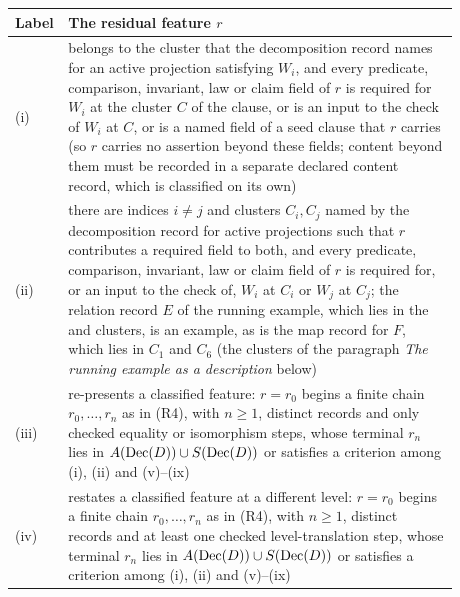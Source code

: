 \begin{longtable}{@{}l>{\raggedright\arraybackslash}p{0.88\linewidth}@{}}
\toprule
Label & The residual feature \(r\) \\
\midrule
\endhead
(i) & belongs to the cluster that the decomposition record names for an active projection satisfying \(W_i\), and every predicate, comparison, invariant, law or claim field of \(r\) is required for \(W_i\) at the cluster \(C\) of the clause, or is an input to the check of \(W_i\) at \(C\), or is a named field of a seed clause that \(r\) carries (so \(r\) carries no assertion beyond these fields; content beyond them must be recorded in a separate declared content record, which is classified on its own) \\
(ii) & there are indices \(i\neq j\) and clusters \(C_i,C_j\) named by the decomposition record for active projections such that \(r\) contributes a required field to both, and every predicate, comparison, invariant, law or claim field of \(r\) is required for, or an input to the check of, \(W_i\) at \(C_i\) or \(W_j\) at \(C_j\); the relation record \(E\) of the running example, which lies in the \Pone{} and \Pfive{} clusters, is an example, as is the map record for \(F\), which lies in \(C_1\) and \(C_6\) (the clusters of the paragraph \emph{The running example as a description} below) \\
(iii) & re-presents a classified feature: \(r=r_0\) begins a finite chain \(r_0,\ldots,r_n\) as in (R4), with \(n\geq1\), distinct records and only checked equality or isomorphism steps, whose terminal \(r_n\) lies in \(A(\operatorname{Dec}\!\left(D\right))\cup S(\operatorname{Dec}\!\left(D\right))\) or satisfies a criterion among (i), (ii) and (v)--(ix) \\
(iv) & restates a classified feature at a different level: \(r=r_0\) begins a finite chain \(r_0,\ldots,r_n\) as in (R4), with \(n\geq1\), distinct records and at least one checked level-translation step, whose terminal \(r_n\) lies in \(A(\operatorname{Dec}\!\left(D\right))\cup S(\operatorname{Dec}\!\left(D\right))\) or satisfies a criterion among (i), (ii) and (v)--(ix) \\

\end{longtable}
